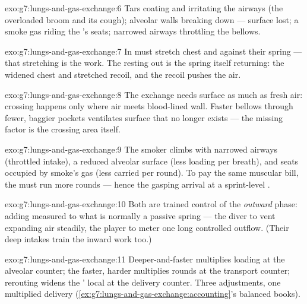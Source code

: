 \begin{solution}{exo:g7:lungs-and-gas-exchange:6}
Tars coating and irritating the airways (the overloaded
broom and its cough); alveolar walls breaking down ---
surface lost; a smoke gas riding the 's  seats;
narrowed airways throttling the bellows.
\end{solution}

\begin{solution}{exo:g7:lungs-and-gas-exchange:7}
In must stretch chest and  against their spring ---
that stretching is the work. The resting out is the spring
itself returning: the widened chest and stretched 
recoil, and the recoil pushes the air.
\end{solution}

\begin{solution}{exo:g7:lungs-and-gas-exchange:8}
The exchange needs surface as much as fresh air: crossing
happens only where air meets blood-lined wall. Faster
bellows through fewer, baggier pockets ventilates surface
that no longer exists --- the missing factor is the
crossing area itself.
\end{solution}

\begin{solution}{exo:g7:lungs-and-gas-exchange:9}
The smoker climbs with narrowed airways (throttled
intake), a reduced alveolar surface (less loading per
breath), and  seats occupied by smoke's gas (less
carried per round). To pay the same muscular bill, the
 must run more rounds --- hence the gasping arrival
at a sprint-level .
\end{solution}

\begin{solution}{exo:g7:lungs-and-gas-exchange:10}
Both are trained control of the \emph{outward} phase:
adding measured  to what is normally a passive
spring --- the diver to vent expanding air steadily, the
player to meter one long controlled outflow. (Their deep
intakes train the inward work too.)
\end{solution}

\begin{solution}{exo:g7:lungs-and-gas-exchange:11}
Deeper-and-faster  multiplies loading at the
alveolar counter; the faster, harder  multiplies
rounds at the transport counter; rerouting widens the
' local  at the delivery counter. Three
adjustments, one multiplied delivery
(\cref{ex:g7:lungs-and-gas-exchange:accounting}'s
balanced books).
\end{solution}


